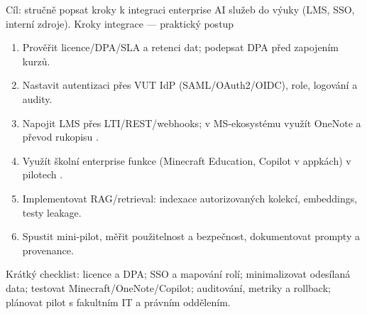 Cíl: stručně popsat kroky k integraci enterprise AI služeb do výuky (LMS, SSO, interní zdroje).
Kroky integrace — praktický postup
\begin{enumerate}
\item Prověřit licence/DPA/SLA a retenci dat; podepsat DPA před zapojením kurzů.
\item Nastavit autentizaci přes VUT IdP (SAML/OAuth2/OIDC), role, logování a audity.
\item Napojit LMS přes LTI/REST/webhooks; v MS‑ekosystému využít OneNote a převod rukopisu \cite{kb_ai_101_tipu_pdf_04e4a115_page_8_1}.
\item Využít školní enterprise funkce (Minecraft Education, Copilot v appkách) v pilotech \cite{kb_ai_101_tipu_pdf_04e4a115_page_15_2,kb_ai_101_tipu_pdf_04e4a115_page_53_1}.
\item Implementovat RAG/retrieval: indexace autorizovaných kolekcí, embeddings, testy leakage.
\item Spustit mini‑pilot, měřit použitelnost a bezpečnost, dokumentovat prompty a provenance.
\end{enumerate}
Krátký checklist: licence a DPA; SSO a mapování rolí; minimalizovat odesílaná data; testovat Minecraft/OneNote/Copilot; auditování, metriky a rollback; plánovat pilot s fakultním IT a právním oddělením.